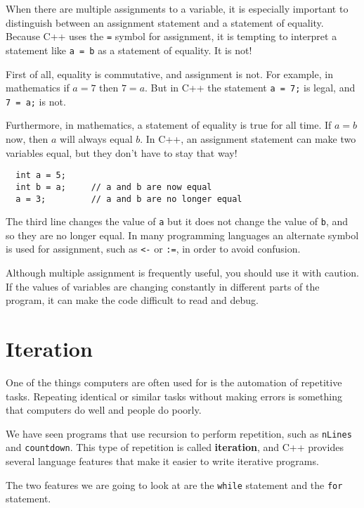 \vspace{0.1in}
\centerline{}
\vspace{0.1in}

When there are multiple assignments to a variable, it is especially
important to distinguish between an assignment statement and a
statement of equality.  Because C++ uses the {\tt =} symbol for
assignment, it is tempting to interpret a statement like {\tt a = b}
as a statement of equality.  It is not!

First of all, equality is commutative, and assignment is not.
For example, in mathematics if $a = 7$ then $7 = a$.  But in
C++ the statement {\tt a = 7;} is legal, and {\tt 7 = a;}
is not.

Furthermore, in mathematics, a statement of equality is true
for all time.  If $a = b$ now, then $a$ will always equal $b$.
In C++, an assignment statement can make two variables equal,
but they don't have to stay that way!

\begin{lstlisting}
  int a = 5;
  int b = a;     // a and b are now equal
  a = 3;         // a and b are no longer equal
\end{lstlisting}
%
The third line changes the value of {\tt a} but it does not
change the value of {\tt b}, and so they are no longer equal.
In many programming languages an alternate symbol is used
for assignment, such as {\tt <-} or {\tt :=}, in order to
avoid confusion.

Although multiple assignment is frequently useful, you should
use it with caution.  If the values of variables are changing
constantly in different parts of the program, it can make
the code difficult to read and debug.

\section{Iteration}

One of the things computers are often used for is the automation
of repetitive tasks.  Repeating identical or similar tasks without
making errors is something that computers do well and people do
poorly.

We have seen programs that use recursion to perform
repetition, such as {\tt nLines} and {\tt countdown}.  This
type of repetition is called {\bf iteration}, and C++ provides
several language features that make it easier to write iterative
programs.

The two features we are going to look at are the {\tt while}
statement and the {\tt for} statement.

